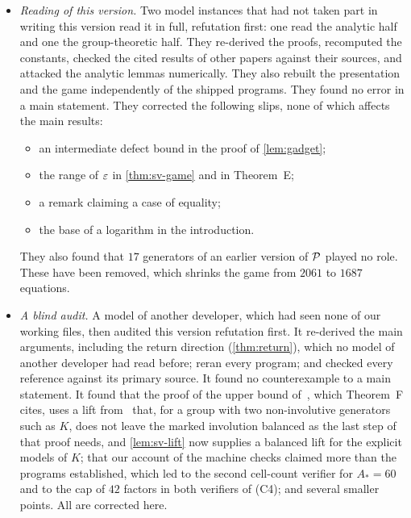 \begin{itemize}[itemsep=1pt]
and two repairable gaps, which are repaired here. The group-theoretic part was checked adversarially in the first draft.
\item \emph{Reading of this version.} Two model instances that had not taken part in writing this version read it in full, refutation
first: one read the analytic half and one the group-theoretic half. They re-derived the proofs, recomputed the constants, checked the cited
results of other papers against their sources, and attacked the analytic lemmas numerically. They also rebuilt the presentation and the
game independently of the shipped programs. They found no error in a main statement. They corrected the following slips, none of which
affects the main results:
\begin{itemize}[itemsep=0pt]
\item an intermediate defect bound in the proof of \cref{lem:gadget};
\item the range of $\varepsilon$ in \cref{thm:sv-game} and in Theorem~E;
\item a remark claiming a case of equality;
\item the base of a logarithm in the introduction.
\end{itemize}
They also found that $17$ generators of an earlier version of $\mathcal P$ played no role. These have been removed, which shrinks the game from
$2061$ to $1687$ equations.
\item \emph{A blind audit.} A model of another developer, which had seen none of our working files, then audited this version refutation
first. It re-derived the main arguments, including the return direction (\cref{thm:return}), which no model of another developer had read
before; reran every program; and checked every reference against its primary source. It found no counterexample to a main statement. It
found that the proof of the upper bound of~\cite[Thm.~1.1]{SV18}, which Theorem~F cites, uses a lift from~\cite[Prop.~4.8]{Slo19} that,
for a group with two non-involutive generators such as $K$, does not leave the marked involution balanced as the last step of that proof
needs, and \cref{lem:sv-lift} now supplies a balanced lift for the explicit models of $K$; that our
account of the machine checks claimed more than the programs established, which led to the second cell-count verifier for $A_*=60$ and to
the cap of $42$ factors in both verifiers of (C4); and several smaller points. All are corrected here.
\end{itemize}
